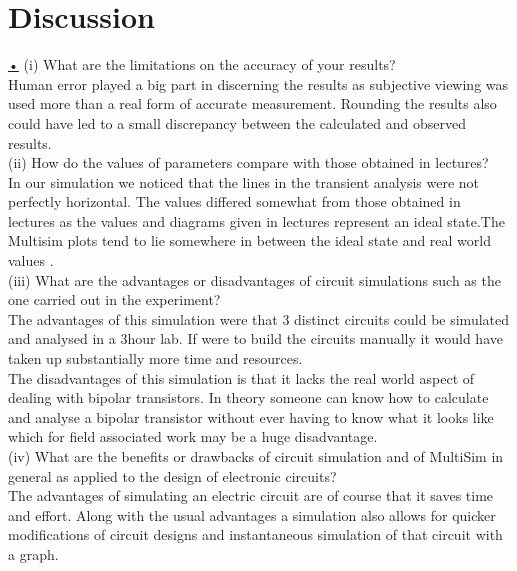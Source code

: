 \documentclass{article}
\begin{document}
\section{Discussion}\label{sec:discuss}\underline{•}
(i) What are the limitations on the accuracy of your results?\\
Human error played a big part in discerning the results as subjective viewing was used more than a real form of accurate measurement. Rounding the results also could have led to a small discrepancy between the calculated and observed results.\\
(ii) How do the values of parameters compare with those obtained in lectures?\\
In our simulation we noticed that the lines in the transient analysis were not perfectly horizontal.
	The values differed somewhat from those obtained in lectures as the values and diagrams given in lectures represent an ideal state.The Multisim plots tend to lie somewhere in between the ideal state and real world values .\\
(iii) What are the advantages or disadvantages of circuit simulations such as the one carried out in the experiment?\\
	The advantages of this simulation were that 3 distinct circuits could be simulated and analysed in a 3hour lab. If were to build the circuits manually it would have taken up substantially more time and resources.
\\
The disadvantages of this simulation is that it lacks the real world aspect of dealing with bipolar transistors. In theory someone can know how to calculate and analyse a bipolar transistor without ever having to know what it looks like which for field associated work may be a huge disadvantage. 
\\
(iv) What are the benefits or drawbacks of circuit simulation and of MultiSim in general as applied to the design of electronic circuits?
\\
The advantages of simulating an electric circuit are of course that it saves time and effort. Along with the usual advantages a simulation also allows for quicker modifications of circuit designs and instantaneous simulation of that circuit with a graph. 
\end{document}
